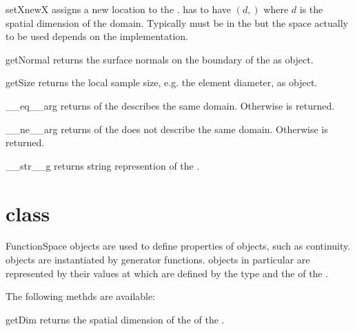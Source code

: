 \begin{methoddesc}[Domain]{setX}{newX}
assigns a new location to the \Domain.  has to have \Shape $(d,)$
where $d$ is the spatial dimension of the domain. Typically  must be
in the \ContinuousFunction but the space actually to be used depends on the \Domain implementation.
\end{methoddesc}

\begin{methoddesc}[Domain]{getNormal}{}
returns the surface normals on the boundary of the \Domain as \Data object.
\end{methoddesc}

\begin{methoddesc}[Domain]{getSize}{}
returns the local sample size, e.g. the element diameter, as \Data object.
\end{methoddesc}

\begin{methoddesc}[Domain]{__eq__}{arg}
returns \True of the \Domain {} describes the same domain. Otherwise
\False is returned.
\end{methoddesc}

\begin{methoddesc}[Domain]{__ne__}{arg}
returns \True of the \Domain {} does not describe the same domain. 
Otherwise \False is returned.
\end{methoddesc}

\begin{methoddesc}[Domain]{__str__}{g}
returns string represention of the \Domain.
\end{methoddesc}

\section{\FunctionSpace class}
\begin{classdesc}{FunctionSpace}{}
\FunctionSpace objects are used to define properties of \Data objects, such as continuity. \FunctionSpace objects
are instantiated by generator functions. \Data objects in particular \FunctionSpace are
represented by their values at \DataSamplePoints which are defined by the type and the \Domain of the
\FunctionSpace.
\end{classdesc}
The following methds are available:
\begin{methoddesc}[FunctionSpace]{getDim}{}
returns the spatial dimension of the \Domain of the \FunctionSpace.
\end{methoddesc}

